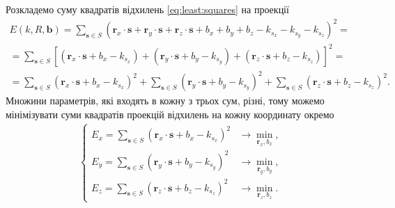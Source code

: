 Розкладемо суму квадратів відхилень \eqref{eq:least:squares} на проекції
\begin{gather*}
  E \left( k, R, \boldsymbol{b} \right) =
  \sum \limits_{\boldsymbol{s} \in S} \left(
    \boldsymbol{r}_x \cdot \boldsymbol{s} + \boldsymbol{r}_y \cdot \boldsymbol{s} +
    \boldsymbol{r}_z \cdot \boldsymbol{s} + b_x + b_y + b_z - k_{s_x} - k_{s_y} - k_{s_z}
  \right)^2 = \\
  = \sum \limits_{\boldsymbol{s} \in S} \left[
    \left( \boldsymbol{r}_x \cdot \boldsymbol{s} + b_x - k_{s_x} \right) +
    \left( \boldsymbol{r}_y \cdot \boldsymbol{s} + b_y - k_{s_y} \right) +
    \left( \boldsymbol{r}_z \cdot \boldsymbol{s} + b_z - k_{s_z} \right) \right]^2 = \\
  = \sum \limits_{\boldsymbol{s} \in S}
      \left( \boldsymbol{r}_x \cdot \boldsymbol{s} + b_x - k_{s_x} \right)^2 +
    \sum \limits_{\boldsymbol{s} \in S}
      \left( \boldsymbol{r}_y \cdot \boldsymbol{s} + b_y - k_{s_y} \right)^2 +
    \sum \limits_{\boldsymbol{s} \in S}
      \left( \boldsymbol{r}_z \cdot \boldsymbol{s} + b_z - k_{s_z} \right)^2.
\end{gather*}
Множини параметрів, які входять в кожну з трьох сум, різні,
тому можемо мінімізувати суми квадратів проекцій відхилень на
кожну координату окремо
\begin{align*}
  \begin{cases}
    E_x =
    \sum \limits_{\boldsymbol{s} \in S}
      \left( \boldsymbol{r}_x \cdot \boldsymbol{s} + b_x - k_{s_x} \right)^2 &\to
    \min \limits_{\boldsymbol{r}_x, b_x}, \\
    E_y =
    \sum \limits_{\boldsymbol{s} \in S}
      \left( \boldsymbol{r}_y \cdot \boldsymbol{s} + b_y - k_{s_y} \right)^2 &\to
    \min \limits_{\boldsymbol{r}_y, b_y}, \\
    E_z =
    \sum \limits_{\boldsymbol{s} \in S}
    \left( \boldsymbol{r}_z \cdot \boldsymbol{s} + b_z - k_{s_z} \right)^2 &\to
    \min \limits_{\boldsymbol{r}_z, b_z}.
  \end{cases}
\end{align*}

